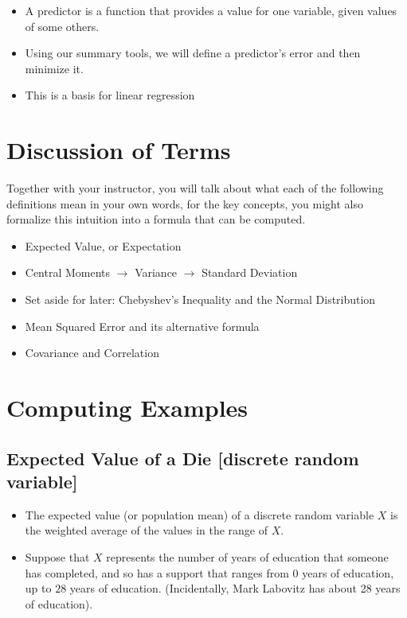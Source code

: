 \documentclass[
]{book}
\providecommand{\tightlist}{%
  \setlength{\itemsep}{0pt}\setlength{\parskip}{0pt}}
\theoremstyle{definition}
\theoremstyle{definition}
\theoremstyle{definition}
\theoremstyle{definition}
\theoremstyle{remark}
\begin{document}
\begin{itemize}
\tightlist
\item
  A predictor is a function that provides a value for one variable, given values of some others.
\item
  Using our summary tools, we will define a predictor's error and then minimize it.
\item
  This is a basis for linear regression
\end{itemize}

\hypertarget{discussion-of-terms}{%
\section{Discussion of Terms}\label{discussion-of-terms}}

Together with your instructor, you will talk about what each of the following definitions mean in your own words, for the key concepts, you might also formalize this intuition into a formula that can be computed.

\begin{itemize}
\tightlist
\item
  Expected Value, or Expectation
\item
  Central Moments \(\rightarrow\) Variance \(\rightarrow\) Standard Deviation
\item
  Set aside for later: Chebyshev's Inequality and the Normal Distribution
\item
  Mean Squared Error and its alternative formula
\item
  Covariance and Correlation
\end{itemize}

\hypertarget{computing-examples}{%
\section{Computing Examples}\label{computing-examples}}

\hypertarget{expected-value-of-a-die-discrete-random-variable}{%
\subsection{Expected Value of a Die {[}discrete random variable{]}}\label{expected-value-of-a-die-discrete-random-variable}}

\begin{itemize}
\tightlist
\item
  The expected value (or population mean) of a discrete random variable \(X\) is the weighted average of the values in the range of \(X\).
\item
  Suppose that \(X\) represents the number of years of education that someone has completed, and so has a support that ranges from \(0\) years of education, up to \(28\) years of education. (Incidentally, Mark Labovitz has about 28 years of education).
\end{itemize}
\end{document}
